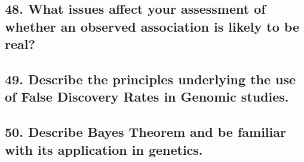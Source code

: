\documentclass{tufte-handout}
\theoremstyle{noparens}
\begin{document}
\newpage
\subsection{48. 
What issues affect your assessment of whether an observed association is likely to be real?
}

\newpage
\subsection{49. 
Describe the principles underlying the use of False Discovery Rates in Genomic studies.
}

\newpage
\subsection{50. 
Describe Bayes Theorem and be familiar with its application in genetics.
}
\end{document}
